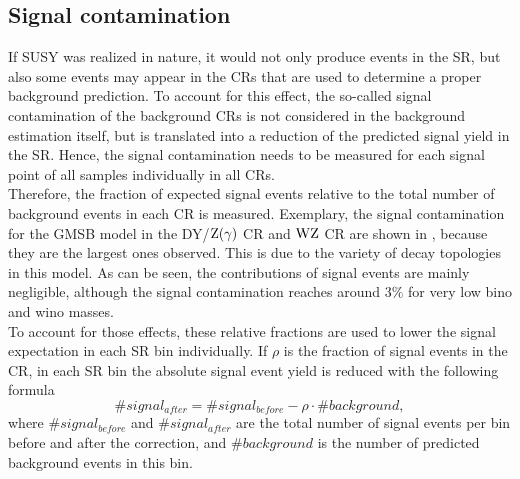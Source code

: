 \subsection{Signal contamination}\label{sec:signalCont}
If SUSY was realized in nature, it would not only produce events in the SR, but also some events may appear in the CRs that are used to determine a proper background prediction. To account for this effect, the so-called signal contamination of the background CRs is not considered in the background estimation itself, but is translated into a reduction of the predicted signal yield in the SR. Hence, the signal contamination needs to be measured for each signal point of all samples individually in all CRs.\\
Therefore, the fraction of expected signal events relative to the total number of background events in each CR is measured.
Exemplary, the signal contamination for the GMSB model in the DY/$\mathrm{Z}(\gamma)$ CR and $\mathrm{W}\mathrm{Z}$ CR are shown in , because they are the largest ones observed. This is due to the variety of decay topologies in this model. As can be seen, the contributions of signal events are mainly negligible, although the signal contamination reaches around $3\%$ for very low bino and wino masses.\\
To account for those effects, these relative fractions are used to lower the signal expectation in each SR bin individually. If $\rho$ is the fraction of signal events in the CR, in each SR bin the absolute signal event yield is reduced with the following formula
\begin{equation}
 \#signal_{after} = \#signal_{before} - \rho\cdot\#background,
\end{equation}
where $\#signal_{before}$ and $\#signal_{after}$ are the total number of signal events per bin before and after the correction, and $\#background$ is the number of predicted background events in this bin.

